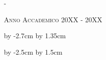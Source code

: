 \begin{titlingpage}
\begin{adjustwidth*}{\unitlength}{-\unitlength}
\begin{center}
\begin{center}
\end{center}




\vspace{4.8cm}


\textsc{Anno Accademico 20XX - 20XX}\\[0.2cm]


\end{center}

\end{adjustwidth*}


\advance\hsize by -2.7cm %
\advance\hoffset by 1.35cm %


\end{titlingpage}


\advance\vsize by -2.5cm %
\advance\voffset by 1.5cm %






